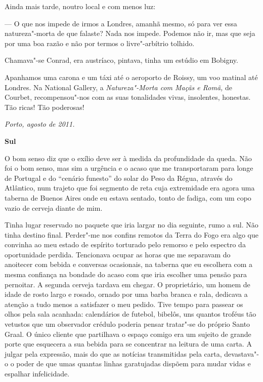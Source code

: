 Ainda mais tarde, noutro local e com menos luz:

--- O que nos impede de irmos a Londres, amanhã mesmo, só para ver essa
  natureza"-morta de que falaste? Nada nos impede. Podemos não ir, mas
  que seja por uma boa razão e não por termos o livre"-arbítrio tolhido.

Chamava"-se Conrad, era austríaco, pintava, tinha um estúdio em
Bobigny.

Apanhamos uma carona e um táxi até o aeroporto de Roissy, um voo
matinal até Londres. Na National Gallery, a \emph{Natureza"-Morta com
Maçãs e Romã, }de Courbet, recompensou"-nos com as suas tonalidades
vivas, insolentes, honestas. Tão ricas! Tão poderosas!

\begin{flushright}
\emph{Porto, agosto de 2011.}
\end{flushright}

\movetooddpage\vspace*{1.8cm}
\noindent{}\textbf{Sul}
\bigskip

O bom senso diz que o exílio deve ser à medida da profundidade da queda.
Não foi o bom senso, mas sim a urgência e o acaso
que me transportaram para longe de Portugal e do ``cenário
funesto'' do solar do Peso da Régua, através do Atlântico, num trajeto
que foi segmento de reta cuja extremidade era agora uma taberna de
Buenos Aires onde eu estava sentado, tonto de fadiga, com um copo vazio
de cerveja diante de mim.

Tinha lugar reservado no paquete que iria largar no dia seguinte, rumo a
sul. Não tinha destino final. Perder"-me nos confins remotos da Terra do
Fogo era algo que convinha ao meu estado de espírito torturado pelo
remorso e pelo espectro da oportunidade perdida. Tencionava ocupar as
horas que me separavam do anoitecer com bebida e conversas ocasionais,
na taberna que eu escolhera com a mesma confiança na bondade do acaso
com que iria escolher uma pensão para pernoitar. A segunda cerveja
tardava em chegar. O proprietário, um homem de idade de rosto largo e
rosado, ornado por uma barba branca e rala, dedicava a atenção a tudo
menos a satisfazer o meu pedido. Tive tempo para passear os olhos pela
sala acanhada:
calendários de futebol, bibelôs, uns quantos troféus tão vetustos que
um observador crédulo poderia pensar tratar"-se do próprio Santo Graal. O
único cliente que partilhava o espaço comigo era um sujeito de grande
porte que esquecera a sua bebida para se concentrar na leitura de uma
carta. A julgar pela expressão, mais do que as notícias transmitidas
pela carta, devastava"-o o poder de que umas quantas linhas garatujadas
dispõem para mudar vidas e espalhar infelicidade.

